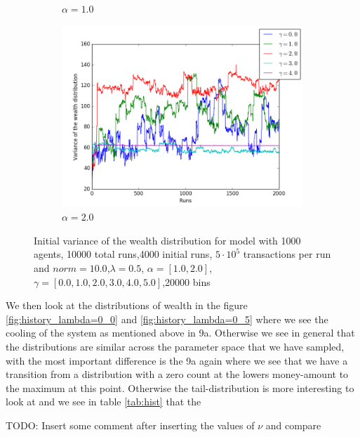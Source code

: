 \documentclass[a4paper,11pt]{article}
\begin{document}
{\begin{figure}[H]
\begin{subfigure}[t]{0.45\textwidth}
		\caption{$\alpha=1.0$ }
		\label{fig:historic_lambda=0_0_alpha=1init}
	\end{subfigure}
	\begin{subfigure}[t]{0.45\textwidth}
		\includegraphics[scale=0.4]{historic_lambda=0_0_alpha=2init}
		\caption{$\alpha=2.0$}
		\label{fig:historic_lambda=0_0_alpha=2init}
	\end{subfigure}
	\caption{Initial variance of the wealth distribution for model with 1000 agents, 10000 total runs,4000 initial runs,  $5\cdot 10^{5}$ transactions per run and  $norm=10.0$,$\lambda=0.5$, $\alpha=[1.0,2.0]$, $\gamma=[0.0,1.0,2.0,3.0,4.0,5.0]$,20000 bins}
	\label{fig:equi}
\end{figure}

We then look at the distributions of wealth in the figure \ref{fig:history_lambda=0_0} and \ref{fig:history_lambda=0_5} where we see the cooling of the system as mentioned above in 9a. Otherwise we see in general that the distributions are similar across the parameter space that we have sampled, with the most important difference is the 9a again where we see that we have a transition from a distribution with a zero count at the lowers money-amount to the maximum at this point. Otherwise the tail-distribution is more interesting to look at and we see in table \ref{tab:hist} that the 

TODO: Insert some comment after inserting the values of $\nu$ and compare


}
\end{document}
